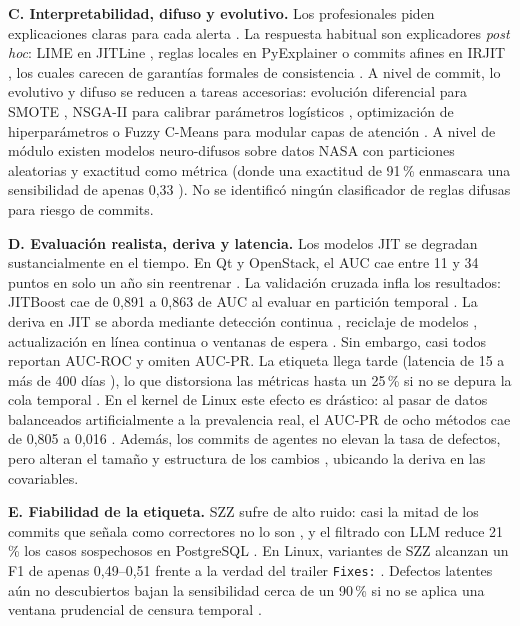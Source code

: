 \textbf{C. Interpretabilidad, difuso y evolutivo.} Los profesionales piden explicaciones claras para cada alerta \cite{Jiarpakdee2021}. La respuesta habitual son explicadores \emph{post hoc}: LIME en JITLine \cite{JITLine2021}, reglas locales en PyExplainer \cite{PyExplainer2021} o commits afines en IRJIT \cite{Sahar2024}, los cuales carecen de garantías formales de consistencia \cite{Yu2024FoX}. A nivel de commit, lo evolutivo y difuso se reducen a tareas accesorias: evolución diferencial para SMOTE \cite{JITLine2021}, NSGA-II para calibrar parámetros logísticos \cite{Chen2018MULTI}, optimización de hiperparámetros \cite{Kang2021,Mostafa2025} o Fuzzy C-Means para modular capas de atención \cite{Chen2025}. A nivel de módulo existen modelos neuro-difusos sobre datos NASA con particiones aleatorias y exactitud como métrica \cite{Aftab2023,Dey2025} (donde una exactitud de 91\,\% enmascara una sensibilidad de apenas 0,33 \cite{Aftab2023}). No se identificó ningún clasificador de reglas difusas para riesgo de commits.

\textbf{D. Evaluación realista, deriva y latencia.} Los modelos JIT se degradan sustancialmente en el tiempo. En Qt y OpenStack, el AUC cae entre 11 y 34 puntos en solo un año sin reentrenar \cite{McIntosh2018}. La validación cruzada infla los resultados: JITBoost cae de 0,891 a 0,863 de AUC al evaluar en partición temporal \cite{Shehab2023}. La deriva en JIT se aborda mediante detección continua \cite{Chitsazian2026}, reciclaje de modelos \cite{Patel2024}, actualización en línea continua \cite{Olewicki2024} o ventanas de espera \cite{Tian2026}. Sin embargo, casi todos reportan AUC-ROC y omiten AUC-PR. La etiqueta llega tarde (latencia de 15 a más de 400 días \cite{Cabral2019}), lo que distorsiona las métricas hasta un 25\,\% si no se depura la cola temporal \cite{Song2023}. En el kernel de Linux este efecto es drástico: al pasar de datos balanceados artificialmente a la prevalencia real, el AUC-PR de ocho métodos cae de 0,805 a 0,016 \cite{Nguyen2025}. Además, los commits de agentes no elevan la tasa de defectos, pero alteran el tamaño y estructura de los cambios \cite{Mazloomzadeh2026}, ubicando la deriva en las covariables.

\textbf{E. Fiabilidad de la etiqueta.} SZZ sufre de alto ruido: casi la mitad de los commits que señala como correctores no lo son \cite{Herbold2022}, y el filtrado con LLM reduce 21\,\% los casos sospechosos en PostgreSQL \cite{Veras2025}. En Linux, variantes de SZZ alcanzan un F1 de apenas 0,49--0,51 frente a la verdad del trailer \texttt{Fixes:} \cite{Lyu2024}. Defectos latentes aún no descubiertos bajan la sensibilidad cerca de un 90\,\% si no se aplica una ventana prudencial de censura temporal \cite{Falessi2022}.

